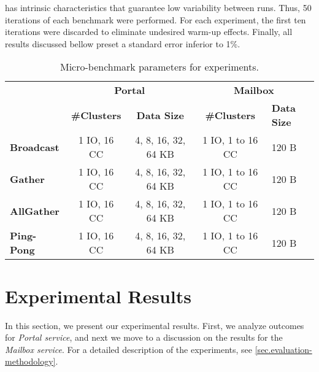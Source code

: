			\mppa has intrinsic characteristics that guarantee low variability
			between runs. Thus, 50 iterations of each benchmark were performed.
			For each experiment, the first ten iterations were discarded to
			eliminate undesired warm-up effects. Finally, all results discussed
			bellow preset a standard error inferior to 1\%.

			\begin{table}[!tb]
				\centering%
				\caption{Micro-benchmark parameters for experiments.}%
				\label{tab:benchmarks-parameters}%

				\begin{tabular}{l|c|c|c|l|}
					\cline{2-5}
															 & \multicolumn{2}{c|}{\textbf{Portal}}      & \multicolumn{2}{c|}{\textbf{Mailbox}}    \\ \cline{2-5}
															 & \textbf{\#Clusters} & \textbf{Data Size}  & \textbf{\#Clusters} & \textbf{Data Size} \\ \hline
					\multicolumn{1}{|l|}{\textbf{Broadcast}} & 1 IO, 16 CC         & 4, 8, 16, 32, 64 KB & 1 IO, 1 to 16 CC    & 120 B              \\ \hline
					\multicolumn{1}{|l|}{\textbf{Gather}}    & 1 IO, 16 CC         & 4, 8, 16, 32, 64 KB & 1 IO, 1 to 16 CC    & 120 B              \\ \hline
					\multicolumn{1}{|l|}{\textbf{AllGather}} & 1 IO, 16 CC         & 4, 8, 16, 32, 64 KB & 1 IO, 1 to 16 CC    & 120 B              \\ \hline
					\multicolumn{1}{|l|}{\textbf{Ping-Pong}} & 1 IO, 16 CC         & 4, 8, 16, 32, 64 KB & 1 IO, 1 to 16 CC    & 120 B              \\ \hline
				\end{tabular}

			\end{table}

	\section{Experimental Results}
	\label{sec.experimental-results}

		In this section, we present our experimental results. First, we
		analyze outcomes for \textit{Portal service}, and next we move to
		a discussion on the results for the \textit{Mailbox service}. For
		a detailed description of the experiments, see \autoref{sec.evaluation-methodology}.

